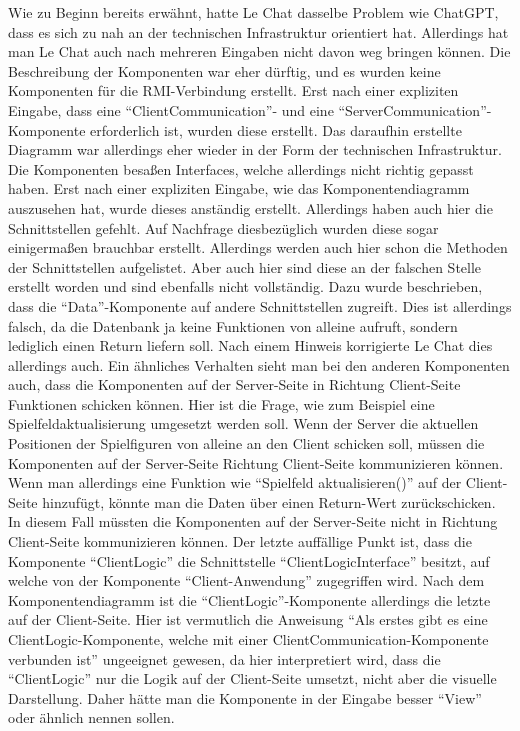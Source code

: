 Wie zu Beginn bereits erwähnt, hatte Le Chat dasselbe Problem wie ChatGPT, dass es sich zu nah an der technischen Infrastruktur orientiert 
hat. Allerdings hat man Le Chat auch nach mehreren Eingaben nicht davon weg bringen können. Die Beschreibung der Komponenten war eher dürftig, und 
es wurden keine Komponenten für die RMI-Verbindung erstellt. Erst nach einer expliziten Eingabe, dass eine ``ClientCommunication''- und eine 
``ServerCommunication''-Komponente erforderlich ist, wurden diese erstellt. Das daraufhin erstellte Diagramm war allerdings eher wieder in der 
Form der technischen Infrastruktur. Die Komponenten besaßen Interfaces, welche allerdings nicht richtig gepasst haben. Erst nach einer 
expliziten Eingabe, wie das Komponentendiagramm auszusehen hat, wurde dieses anständig erstellt. Allerdings haben auch hier die 
Schnittstellen gefehlt. Auf Nachfrage diesbezüglich wurden diese sogar einigermaßen brauchbar erstellt. Allerdings werden auch hier schon die 
Methoden der Schnittstellen aufgelistet. Aber auch hier sind diese an der falschen Stelle erstellt worden und sind ebenfalls nicht 
vollständig. Dazu wurde beschrieben, dass die ``Data''-Komponente auf andere Schnittstellen zugreift. Dies ist allerdings falsch, da die 
Datenbank ja keine Funktionen von alleine aufruft, sondern lediglich einen Return liefern soll. Nach einem Hinweis korrigierte Le Chat dies 
allerdings auch. Ein ähnliches Verhalten sieht man bei den anderen Komponenten auch, dass die Komponenten auf der Server-Seite in Richtung 
Client-Seite Funktionen schicken können. Hier ist die Frage, wie zum Beispiel eine Spielfeldaktualisierung umgesetzt werden soll. Wenn der 
Server die aktuellen Positionen der Spielfiguren von alleine an den Client schicken soll, müssen die Komponenten auf der Server-Seite Richtung 
Client-Seite kommunizieren können. Wenn man allerdings eine Funktion wie ``Spielfeld aktualisieren()'' auf der Client-Seite hinzufügt, könnte 
man die Daten über einen Return-Wert zurückschicken. In diesem Fall müssten die Komponenten auf der Server-Seite nicht in Richtung Client-Seite 
kommunizieren können. Der letzte auffällige Punkt ist, dass die Komponente ``ClientLogic'' die Schnittstelle ``ClientLogicInterface'' besitzt, 
auf welche von der Komponente ``Client-Anwendung'' zugegriffen wird. Nach dem Komponentendiagramm ist die ``ClientLogic''-Komponente allerdings die 
letzte auf der Client-Seite. Hier ist vermutlich die Anweisung ``Als erstes gibt es eine ClientLogic-Komponente, welche mit einer 
ClientCommunication-Komponente verbunden ist'' ungeeignet gewesen, da hier interpretiert wird, dass die ``ClientLogic'' nur die Logik auf der 
Client-Seite umsetzt, nicht aber die visuelle Darstellung. Daher hätte man die Komponente in der Eingabe besser ``View'' oder ähnlich nennen 
sollen.

